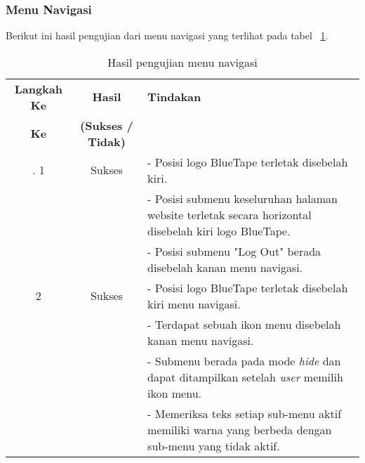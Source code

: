 \subsubsection{Menu Navigasi}
Berikut ini hasil pengujian dari menu navigasi yang terlihat pada tabel ~\ref{hasil:MenuNavigasi}.
\begin{table}[H]
	\centering 
	\caption{Hasil pengujian menu navigasi}
	\label{hasil:MenuNavigasi}
	\begin{tabular}{|c| c| p{}|}
		\toprule
		\textbf{Langkah Ke} & \textbf{Hasil} & \textbf{Tindakan}\\
		\textbf{Ke} & \textbf{(Sukses / Tidak)} &\\
		\midrule.
		1&Sukses& - Posisi logo BlueTape terletak disebelah kiri. \\
		&& - Posisi submenu keseluruhan halaman website terletak secara horizontal disebelah kiri logo BlueTape. \\
		&& - Posisi submenu "Log Out" berada disebelah kanan menu navigasi. \\
		\hline
		2 & Sukses & - Posisi logo BlueTape terletak disebelah kiri menu navigasi. \\
		&& - Terdapat sebuah ikon menu disebelah kanan menu navigasi. \\
		&& - Submenu berada pada mode \textit{hide} dan dapat ditampilkan setelah \textit{user} memilih ikon menu. \\
		&& - Memeriksa teks setiap sub-menu aktif memiliki warna yang berbeda dengan sub-menu yang tidak aktif. \\		
		\bottomrule		
	\end{tabular} 
\end{table}

